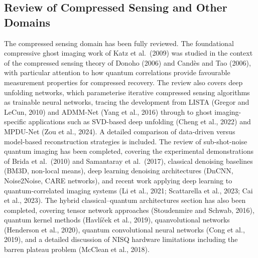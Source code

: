 \documentclass[12pt,a4paper]{article}
\begin{document}
\subsection{Review of Compressed Sensing and Other Domains}
The compressed sensing domain has been fully reviewed. The foundational compressive ghost imaging work of Katz et al.\ (2009) was studied in the context of the compressed sensing theory of Donoho (2006) and Cand\`{e}s and Tao (2006), with particular attention to how quantum correlations provide favourable measurement properties for compressed recovery. The review also covers deep unfolding networks, which parameterise iterative compressed sensing algorithms as trainable neural networks, tracing the development from LISTA (Gregor and LeCun, 2010) and ADMM-Net (Yang et al., 2016) through to ghost imaging-specific applications such as SVD-based deep unfolding (Cheng et al., 2022) and MPDU-Net (Zou et al., 2024). A detailed comparison of data-driven versus model-based reconstruction strategies is included.
The review of sub-shot-noise quantum imaging has been completed, covering the experimental demonstrations of Brida et al.\ (2010) and Samantaray et al.\ (2017), classical denoising baselines (BM3D, non-local means), deep learning denoising architectures (DnCNN, Noise2Noise, CARE networks), and recent work applying deep learning to quantum-correlated imaging systems (Li et al., 2021; Scattarella et al., 2023; Cai et al., 2023). The hybrid classical--quantum architectures section has also been completed, covering tensor network approaches (Stoudenmire and Schwab, 2016), quantum kernel methods (Havl\'{i}\v{c}ek et al., 2019), quanvolutional networks (Henderson et al., 2020), quantum convolutional neural networks (Cong et al., 2019), and a detailed discussion of NISQ hardware limitations including the barren plateau problem (McClean et al., 2018).
\end{document}
